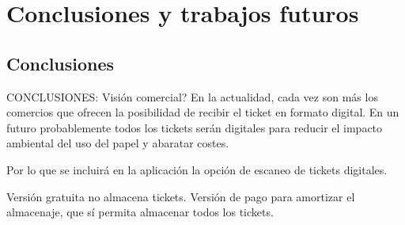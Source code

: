 \chapter{Conclusiones y trabajos futuros}

\section{Conclusiones}

CONCLUSIONES: Visión comercial?
En la actualidad, cada vez son más los comercios que ofrecen la posibilidad de recibir 
el ticket en formato digital. En un futuro probablemente todos los tickets serán 
digitales para reducir el impacto ambiental del uso del papel y abaratar costes.

Por lo que se incluirá en la aplicación la opción de escaneo de tickets digitales.


Versión gratuita no almacena tickets.
Versión de pago para amortizar el almacenaje, que sí permita almacenar todos los tickets.